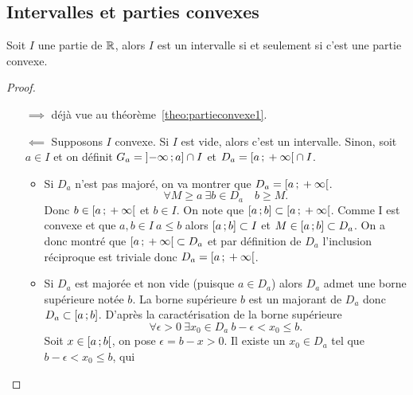 \subsection{Intervalles et parties convexes}

\begin{theo}
  Soit \(I\) une partie de \(\mathbb{R}\), alors \(I\) est un intervalle si et seulement
  si c'est une partie convexe.
\end{theo}
\begin{proof}
  \begin{itemize}
    \item[\(\implies\)] déjà vue au théorème~\ref{theo:partieconvexe1}.
    \item[\(\impliedby\)] Supposons \(I\) convexe. Si \(I\) est vide, alors
      c'est un intervalle. Sinon, soit \(a\in I\) et on définit \(G_a =
      \left]  - \infty \, ; {} a \right]\cap I\) et \(D_a = \left[ a \, ; {}  +
      \infty \right[\cap I\).
      \begin{itemize}
        \item Si \(D_a\) n'est pas majoré, on va montrer que \(D_a =
          \left[ a \, ; {}  + \infty \right[\).
          \begin{equation}
            \forall M \geqslant a \ \exists b \in D_a \quad b\geqslant M.
          \end{equation}
          Donc \(b\in \left[ a \, ; {}  + \infty \right[\) et \(b\in I\). On note que
          \(\left[ a \, ; {} b \right]\subset \left[ a \, ; {}  + \infty \right[\). Comme I
          est convexe et que \(a, b \in I \ a \leqslant b\) alors
          \(\left[ a \, ; {} b \right]\subset I\) et \(M\in \left[ a \, ; {} b \right] \subset
          D_a\). On a donc montré que \(\left[ a \, ; {}  + \infty \right[ \subset
          D_a\) et par définition de \(D_a\) l'inclusion réciproque est triviale
          donc \(D_a = \left[ a \, ; {}  + \infty \right[\).
        \item Si \(D_a\) est majorée et non vide (puisque \(a\in D_a\)) alors
          \(D_a\) admet une borne supérieure notée \(b\). La borne supérieure
          \(b\) est un majorant de \(D_a\) donc \(D_a \subset
          \left[ a \, ; {} b \right]\). D'après la caractérisation de la borne
          supérieure
          \begin{equation}
            \forall \epsilon >0 \ \exists x_0 \in D_a \ b - \epsilon <
            x_0\leqslant b.
          \end{equation}
          Soit \(x\in \left[ a \, ; {} b \right[\), on pose \(\epsilon = b - x>0\). Il
          existe un \(x_0\in D_a\) tel que \(b - \epsilon<x_0 \leqslant b\), qui

\end{itemize}
\end{itemize}
\end{proof}
